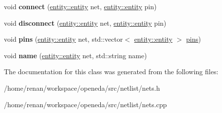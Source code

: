\begin{DoxyCompactItemize}
\item 
\hypertarget{classophidian_1_1netlist_1_1nets_aef35861695fc28ecc4b71a00e24adf97}{void {\bfseries connect} (\hyperlink{classophidian_1_1entity_1_1entity}{entity\-::entity} net, \hyperlink{classophidian_1_1entity_1_1entity}{entity\-::entity} pin)}\label{classophidian_1_1netlist_1_1nets_aef35861695fc28ecc4b71a00e24adf97}

\item 
\hypertarget{classophidian_1_1netlist_1_1nets_a1477fd894470960f368ee16a5029075f}{void {\bfseries disconnect} (\hyperlink{classophidian_1_1entity_1_1entity}{entity\-::entity} net, \hyperlink{classophidian_1_1entity_1_1entity}{entity\-::entity} pin)}\label{classophidian_1_1netlist_1_1nets_a1477fd894470960f368ee16a5029075f}

\item 
\hypertarget{classophidian_1_1netlist_1_1nets_a0a7db9d745a634a1e63373aef9b72630}{void {\bfseries pins} (\hyperlink{classophidian_1_1entity_1_1entity}{entity\-::entity} net, std\-::vector$<$ \hyperlink{classophidian_1_1entity_1_1entity}{entity\-::entity} $>$ \hyperlink{classophidian_1_1netlist_1_1pins}{pins})}\label{classophidian_1_1netlist_1_1nets_a0a7db9d745a634a1e63373aef9b72630}

\item 
\hypertarget{classophidian_1_1netlist_1_1nets_a011db22f9fede13f3bdb91f917c3d775}{void {\bfseries name} (\hyperlink{classophidian_1_1entity_1_1entity}{entity\-::entity} net, std\-::string name)}\label{classophidian_1_1netlist_1_1nets_a011db22f9fede13f3bdb91f917c3d775}

\end{DoxyCompactItemize}


The documentation for this class was generated from the following files\-:\begin{DoxyCompactItemize}
\item 
/home/renan/workspace/openeda/src/netlist/nets.\-h\item 
/home/renan/workspace/openeda/src/netlist/nets.\-cpp\end{DoxyCompactItemize}
